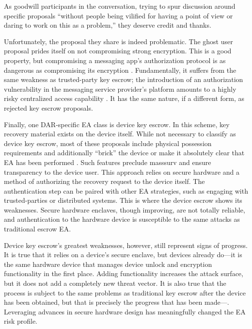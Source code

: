 As goodwill participants in the conversation, trying to spur discussion around specific proposals ``without people being
vilified for having a point of view or daring to work on this as a problem,'' they deserve credit and thanks.

Unfortunately, the proposal they share is indeed problematic. The ghost user proposal prides itself on not compromising
strong encryption. This is a good property, but compromising a messaging app's authorization protocol is as dangerous as
compromising its encryption \cite{callas_1_2019}. Fundamentally, it suffers from the same weakness as trusted-party key
escrow; the introduction of an authorization vulnerability in the messaging service provider's platform amounts to a
highly risky centralized access capability \cite{schneier_ghost_2019}. It has the same nature, if a different form, as
rejected key escrow proposals.

Finally, one \ac{DAR}-specific \ac{EA} class is device key escrow. In this scheme, key recovery material exists on the
device itself. While not necessary to classify as device key escrow, most of these proposals include physical possession
requirements and additionally ``brick'' the device or make it absolutely clear that \ac{EA} has been performed
\cite{savage_lawful_2018} \cite{ozzie_2018}. Such features preclude \ac{masssurv} and ensure transparency to the device
user. This approach relies on secure hardware and a method of authorizing the recovery request to the device itself. The
authentication step can be paired with other \ac{EA} strategies, such as engaging with trusted-parties or distributed
systems. This is where the device escrow shows its weaknesses. Secure hardware enclaves, though improving, are not
totally reliable, and authentication to the hardware device is susceptible to the same attacks as traditional escrow
\ac{EA}.

Device key escrow's greatest weaknesses, however, still represent signs of progress. It is true that it relies on a
device's secure enclave, but devices already do---it is the same hardware device that manages device unlock and
encryption functionality in the first place. Adding functionality increases the attack surface, but it does not add a
completely new threat vector. It is also true that the process is subject to the same problems as traditional key escrow
after the device has been obtained, but that is precisely the progress that has been made---. Leveraging advances in secure hardware design has meaningfully changed the \ac{EA} risk profile.

